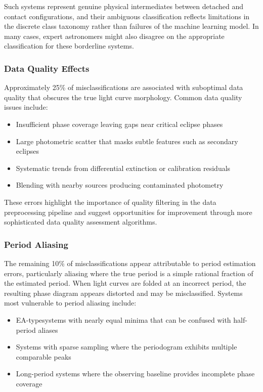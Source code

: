 \documentclass[11pt,a4paper]{article}
\newcommand{\EA}{EA-type}
\begin{document}
Such systems represent genuine physical intermediates between detached and contact configurations, and their ambiguous classification reflects limitations in the discrete class taxonomy rather than failures of the machine learning model. In many cases, expert astronomers might also disagree on the appropriate classification for these borderline systems.

\subsubsection{Data Quality Effects}

Approximately 25\% of misclassifications are associated with suboptimal data quality that obscures the true light curve morphology. Common data quality issues include:
\begin{itemize}
    \item Insufficient phase coverage leaving gaps near critical eclipse phases
    \item Large photometric scatter that masks subtle features such as secondary eclipses
    \item Systematic trends from differential extinction or calibration residuals
    \item Blending with nearby sources producing contaminated photometry
\end{itemize}

These errors highlight the importance of quality filtering in the data preprocessing pipeline and suggest opportunities for improvement through more sophisticated data quality assessment algorithms.

\subsubsection{Period Aliasing}

The remaining 10\% of misclassifications appear attributable to period estimation errors, particularly aliasing where the true period is a simple rational fraction of the estimated period. When light curves are folded at an incorrect period, the resulting phase diagram appears distorted and may be misclassified. Systems most vulnerable to period aliasing include:
\begin{itemize}
    \item \EA systems with nearly equal minima that can be confused with half-period aliases
    \item Systems with sparse sampling where the periodogram exhibits multiple comparable peaks
    \item Long-period systems where the observing baseline provides incomplete phase coverage
\end{itemize}
\end{document}
